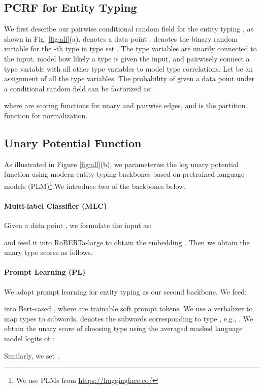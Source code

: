\documentclass[11pt]{article}
\begin{document}
\subsection{PCRF for Entity Typing}
We first describe our pairwise conditional random field for the entity typing \cite{pcrf2005}, as shown in Fig. \ref{fig:all}(a).  denotes a data point .  denotes the binary random variable for the -th type in type set . The type variables  are unarily connected to the input, model how likely a type is given the input, and pairwisely connect a type variable with all other type variables to model type correlations.
Let  be an assignment of all the type variables. The probability of  given a data point  under a conditional random field can be factorized as:

where  are scoring functions for unary and pairwise edges, and  is the partition function for normalization.

\subsection{Unary Potential Function}
\label{sec:backbone}
As illustrated in Figure \ref{fig:all}(b), we parameterize the log unary potential function  using modern entity typing backbones based on pretrained language models (PLM)\footnote{We use PLMs from \url{https://huggingface.co/}}.We introduce two of the backbones below. 
\paragraph{Multi-label Classifier (MLC)} Given a data point , we formulate the input as:

and feed it into RoBERTa-large \cite{liu2019roberta} to obtain the  embedding . Then we obtain the unary type scores as follows.

\paragraph{Prompt Learning (PL)} We adopt prompt learning for entity typing \cite{ding2021prompt,dfet} as our second backbone. We feed:

into Bert-cased \cite{devlin2018bert}, where  are trainable soft prompt tokens. We use a verbalizer  to map types to subwords,  denotes the subwords corresponding to type , e.g., . We obtain the unary score of choosing type  using the averaged masked language model logits of :

Similarly, we set .
\end{document}
